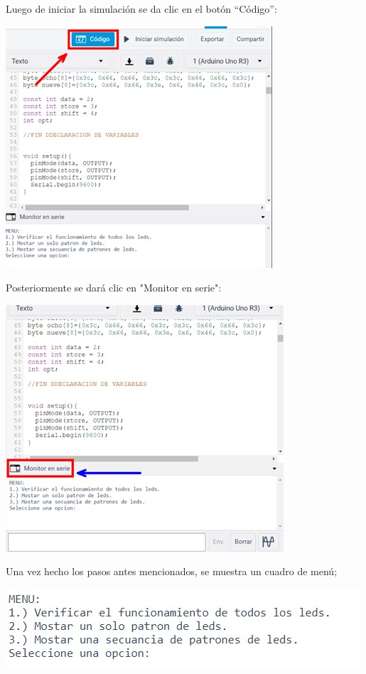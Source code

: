 \documentclass{article}
\begin{document}
Luego de iniciar la simulación se da clic en el botón “Código”:

\includegraphics[scale=0.6]{images/Codigo.jpg}
\newline

Posteriormente se dará clic en "Monitor en serie":

\includegraphics[scale=0.5]{images/MonitorSerial.jpg}
\newline

Una vez hecho los pasos antes mencionados, se muestra un cuadro de menú;

\includegraphics[scale=0.9]{images/Menu.jpg}
\newline
\end{document}
